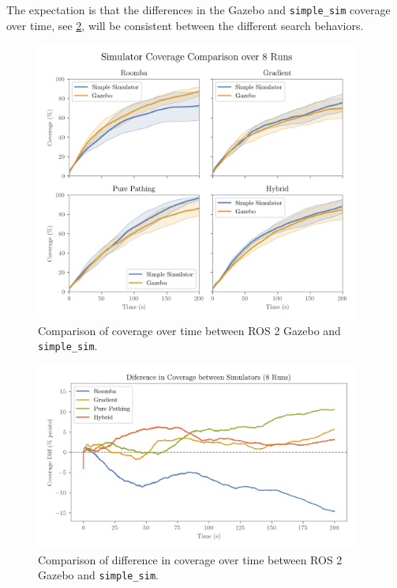 The expectation is that the differences in the Gazebo and \texttt{simple\_sim} coverage over time, see \cref{fig:coverage-benchmark-diff}, will be consistent between the different search behaviors.

\begin{figure}
    \begin{center}
        \includegraphics[width=0.95\textwidth]{./figures/plots/consistency/gazebo_vs_simple_sim_coverage.png}
    \end{center}
  \caption{Comparison of coverage over time between ROS 2 Gazebo and \texttt{simple\_sim}.}
  \label{fig:coverage-benchmark-all}
\end{figure}

\begin{figure}[H]
    \begin{center}
        \includegraphics[width=0.95\textwidth]{./figures/plots/consistency/sim_coverage_diff.png}
    \end{center}
    \caption{Comparison of difference in coverage over time between ROS 2 Gazebo and \texttt{simple\_sim}.}
    \label{fig:coverage-benchmark-diff}
\end{figure}

